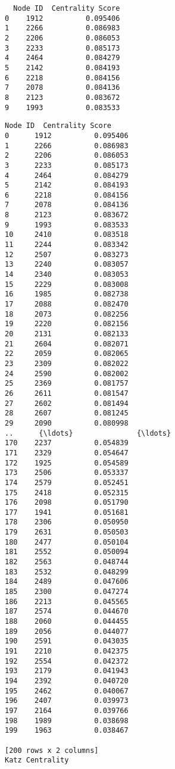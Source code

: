 \documentclass[11pt]{article}
\begin{document}
    
    \begin{verbatim}
  Node ID  Centrality Score
0    1912          0.095406
1    2266          0.086983
2    2206          0.086053
3    2233          0.085173
4    2464          0.084279
5    2142          0.084193
6    2218          0.084156
7    2078          0.084136
8    2123          0.083672
9    1993          0.083533
    \end{verbatim}

    
    \begin{Verbatim}[commandchars=\\\{\}]
    Node ID  Centrality Score
0      1912          0.095406
1      2266          0.086983
2      2206          0.086053
3      2233          0.085173
4      2464          0.084279
5      2142          0.084193
6      2218          0.084156
7      2078          0.084136
8      2123          0.083672
9      1993          0.083533
10     2410          0.083518
11     2244          0.083342
12     2507          0.083273
13     2240          0.083057
14     2340          0.083053
15     2229          0.083008
16     1985          0.082738
17     2088          0.082470
18     2073          0.082256
19     2220          0.082156
20     2131          0.082133
21     2604          0.082071
22     2059          0.082065
23     2309          0.082022
24     2590          0.082002
25     2369          0.081757
26     2611          0.081547
27     2602          0.081494
28     2607          0.081245
29     2090          0.080998
..      {\ldots}               {\ldots}
170    2237          0.054839
171    2329          0.054647
172    1925          0.054589
173    2506          0.053337
174    2579          0.052451
175    2418          0.052315
176    2098          0.051790
177    1941          0.051681
178    2306          0.050950
179    2631          0.050503
180    2477          0.050104
181    2552          0.050094
182    2563          0.048744
183    2532          0.048299
184    2489          0.047606
185    2300          0.047274
186    2213          0.045565
187    2574          0.044670
188    2060          0.044455
189    2056          0.044077
190    2591          0.043035
191    2210          0.042375
192    2554          0.042372
193    2179          0.041943
194    2392          0.040720
195    2462          0.040067
196    2407          0.039973
197    2164          0.039766
198    1989          0.038698
199    1963          0.038467

[200 rows x 2 columns]
Katz Centrality

    \end{Verbatim}
\end{document}
